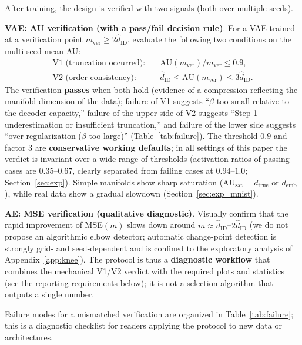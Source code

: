 \documentclass[make,article,submit,pdftex,moreauthors]{Definitions/mdpi}
\newcommand{\hatdID}{\hat{d}_{\mathrm{ID}}}
\newcommand{\dtrue}{d_{\mathrm{true}}}
\newcommand{\AUsat}{\mathrm{AU}_{\mathrm{sat}}}
\newcommand{\demb}{d_{\mathrm{emb}}}
\begin{document}
After training, the design is verified with two signals (both over multiple
seeds).

\textbf{VAE: AU verification (with a pass/fail decision rule)}.
For a VAE trained at a verification point $m_{\mathrm{ver}} \geq 2\hatdID$,
evaluate the following two conditions on the multi-seed mean AU:
\begin{align}
  \text{V1 (truncation occurred)}:&\quad
  \mathrm{AU}(m_{\mathrm{ver}}) / m_{\mathrm{ver}} \leq 0.9,
  \label{eq:rule_v1}\\
  \text{V2 (order consistency)}:&\quad
  \hatdID \leq \mathrm{AU}(m_{\mathrm{ver}}) \leq 3\hatdID.
  \label{eq:rule_v2}
\end{align}
The verification \textbf{passes} when both hold (evidence of a compression
reflecting the manifold dimension of the data);
failure of V1 suggests ``$\beta$ too small relative to the decoder
capacity,'' failure of the upper side of V2 suggests ``Step-1
underestimation or insufficient truncation,'' and failure of the lower side
suggests ``over-regularization ($\beta$ too large)''
(Table~\ref{tab:failure}).
The threshold $0.9$ and factor $3$ are \textbf{conservative working
defaults}; in all settings of this paper the verdict is invariant over a
wide range of thresholds (activation ratios of passing cases are
$0.35$--$0.67$, clearly separated from failing cases at $0.94$--$1.0$;
Section~\ref{sec:exp}).
Simple manifolds show sharp saturation ($\AUsat = \dtrue$ or $\demb$), while
real data show a gradual slowdown (Section~\ref{sec:exp_mnist}).

\textbf{AE: MSE verification (qualitative diagnostic)}.
Visually confirm that the rapid improvement of MSE$(m)$ slows down
around $m \approx \hatdID$--$2\hatdID$ (we do not propose an
algorithmic elbow detector; automatic change-point detection is
strongly grid- and seed-dependent and is confined to the exploratory
analysis of Appendix~\ref{app:knee}).
The protocol is thus a \textbf{diagnostic workflow} that combines the
mechanical V1/V2 verdict with the required plots and statistics (see the
reporting requirements below); it is not a selection algorithm that outputs
a single number.

Failure modes for a mismatched verification are organized in
Table~\ref{tab:failure}; this is a diagnostic checklist for readers applying
the protocol to new data or architectures.
\end{document}
